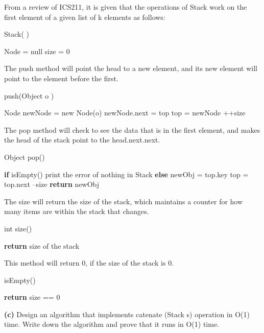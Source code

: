 \documentclass[12pt]{article}
\begin{document}
 \linebreak
 From a review of ICS211, it is given that the operations of Stack work on the first element of a given list of k elements as follows: \\
\begin{algorithm}[H]
\caption{Stack( )}
\begin{algorithmic}[H]
\State Node = null
\State size = 0
\end{algorithmic}
\end{algorithm}
The push method will point the head to a new element, and its new element will point to the element before the first. \\
\begin{algorithm}[H]
\caption{push(Object o )}
\begin{algorithmic}[H]
\State Node newNode = new Node(o)
\State newNode.next = top
\State top = newNode
\State ++size
\end{algorithmic}
\end{algorithm}
The pop method will check to see the data that is in the first element, and makes the head of the stack point to the head.next.next. \\
\begin{algorithm}[H]
\caption{Object pop()}
\begin{algorithmic}[H]
\State \textbf{if} isEmpty()
\State \qquad print the error of nothing in Stack
\State \textbf{else}
\State \qquad newObj = top.key
\State \qquad top = top.next 
\State \qquad --size
\State \textbf{return} newObj
\end{algorithmic}
\end{algorithm}
The size will return the size of the stack, which maintains a counter for how many items are within the stack that changes. \\
\begin{algorithm}[H]
\caption{int size()}
\begin{algorithmic}[H]
\State \textbf{return} size of the stack
\end{algorithmic}
\end{algorithm}
This method will return 0, if the size of the stack is 0. \\
\begin{algorithm}[H]
\caption{isEmpty()}
\begin{algorithmic}[H]
\State \textbf{return} size == 0
\end{algorithmic}
\end{algorithm}
 \textbf{(c)} Design an algorithm that implements catenate (Stack s) operation in O(1) time.  Write down the algorithm and prove that it runs in O(1) time. \\
\end{document}
